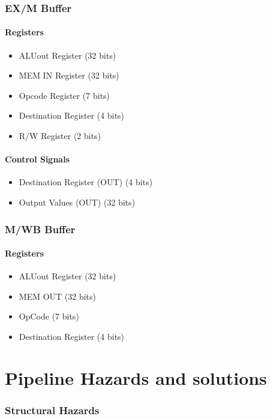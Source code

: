 \documentclass[12pt]{report}
\begin{document}
\section{EX/M Buffer}

\subsection{Registers}
\begin{itemize}
    \item ALUout Register (32 bits)
    \item MEM IN Register (32 bits)
    \item Opcode Register (7 bits)
    \item Destination Register (4 bits)
    \item R/W Register (2 bits)
\end{itemize}

\subsection{Control Signals}
\begin{itemize}
    \item Destination Register (OUT) (4 bits)
    \item Output Values (OUT) (32 bits)
\end{itemize}

\section{M/WB Buffer}

\subsection{Registers}
\begin{itemize}
    \item ALUout Register (32 bits)
    \item MEM OUT (32 bits)
    \item OpCode (7 bits)
    \item Destination Register (4 bits)
\end{itemize}

\part{Pipeline Hazards and solutions}

\section{Structural Hazards}
\end{document}
